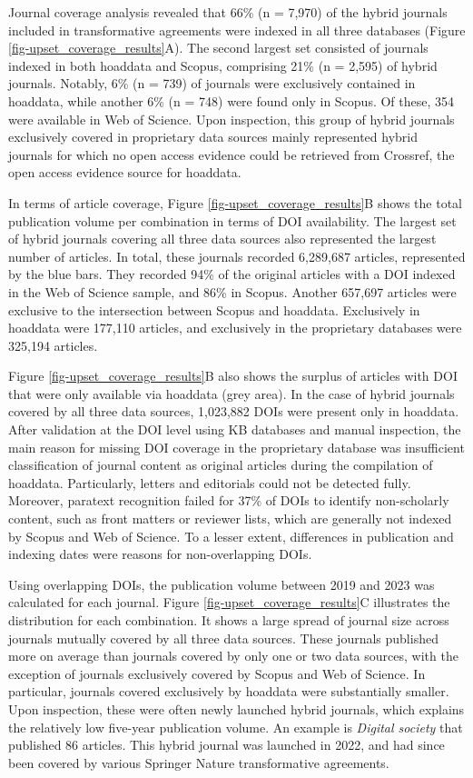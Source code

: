 \documentclass[a4paper,man,floatsintext,longtable,noextraspace,10pt]{apa6}
\begin{document}
Journal coverage analysis revealed that 66\% (n = 7,970) of the hybrid
journals included in transformative agreements were indexed in all three
databases (Figure \ref{fig-upset_coverage_results}A). The second largest
set consisted of journals indexed in both hoaddata and Scopus,
comprising 21\% (n = 2,595) of hybrid journals. Notably, 6\% (n = 739)
of journals were exclusively contained in hoaddata, while another 6\% (n
= 748) were found only in Scopus. Of these, 354 were available in Web of
Science. Upon inspection, this group of hybrid journals exclusively
covered in proprietary data sources mainly represented hybrid journals
for which no open access evidence could be retrieved from Crossref, the
open access evidence source for hoaddata.

In terms of article coverage, Figure \ref{fig-upset_coverage_results}B
shows the total publication volume per combination in terms of DOI
availability. The largest set of hybrid journals covering all three data
sources also represented the largest number of articles. In total, these
journals recorded 6,289,687 articles, represented by the blue bars. They
recorded 94\% of the original articles with a DOI indexed in the Web of
Science sample, and 86\% in Scopus. Another 657,697 articles were
exclusive to the intersection between Scopus and hoaddata. Exclusively
in hoaddata were 177,110 articles, and exclusively in the proprietary
databases were 325,194 articles.

Figure \ref{fig-upset_coverage_results}B also shows the surplus of
articles with DOI that were only available via hoaddata (grey area). In
the case of hybrid journals covered by all three data sources, 1,023,882
DOIs were present only in hoaddata. After validation at the DOI level
using KB databases and manual inspection, the main reason for missing
DOI coverage in the proprietary database was insufficient classification
of journal content as original articles during the compilation of
hoaddata. Particularly, letters and editorials could not be detected
fully. Moreover, paratext recognition failed for 37\% of DOIs to
identify non-scholarly content, such as front matters or reviewer lists,
which are generally not indexed by Scopus and Web of Science. To a
lesser extent, differences in publication and indexing dates were
reasons for non-overlapping DOIs.

Using overlapping DOIs, the publication volume between 2019 and 2023 was
calculated for each journal. Figure \ref{fig-upset_coverage_results}C
illustrates the distribution for each combination. It shows a large
spread of journal size across journals mutually covered by all three
data sources. These journals published more on average than journals
covered by only one or two data sources, with the exception of journals
exclusively covered by Scopus and Web of Science. In particular,
journals covered exclusively by hoaddata were substantially smaller.
Upon inspection, these were often newly launched hybrid journals, which
explains the relatively low five-year publication volume. An example is
\emph{Digital society} that published 86 articles. This hybrid journal
was launched in 2022, and had since been covered by various Springer
Nature transformative agreements.
\end{document}
